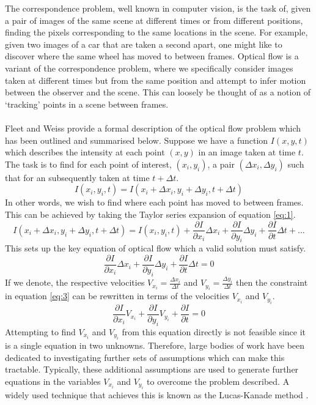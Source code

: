 The correspondence problem, well known in computer vision, is the task of, given a pair of images of the same scene at different times or from different positions, finding 
the pixels corresponding to the same locations in the scene.
For example, given two images of a car that are taken a second apart, one might like to discover where the same wheel has moved to between frames.
Optical flow is a variant of the correspondence problem, where we specifically consider images taken at different times but from the same position and attempt to infer motion between the observer 
and the scene. This can loosely be thought of as a notion of `tracking' points in a scene between frames.
\\\\
Fleet and Weiss \cite{Fleet2006} provide a formal description of the optical flow problem which has been outlined and summarised below.
Suppose we have a function $I(x,y,t)$ which describes the intensity at each point $(x,y)$ in an image taken at time $t$. 
The task is to find for each point of interest, $(x_i, y_i)$,
a pair $(\Delta x_i, \Delta y_i)$ such that for an subsequently taken at time $t + \Delta t$.
\begin{equation}
 I(x_i,y_i,t) = I(x_i + \Delta x_i, y_i + \Delta y_i, t+\Delta t)
 \label{eq:1}
\end{equation}
In other words, we wish to find where each point has moved to between frames.
This can be achieved by taking the Taylor series expansion of equation \ref{eq:1}.
\begin{equation}
I(x_i + \Delta x_i, y_i + \Delta y_i, t+\Delta t) = I(x_i,y_i,t) + \frac{\partial I}{\partial x_i}\Delta x_i + \frac{\partial I}{\partial y_i} \Delta y_i + \frac{\partial I}{\partial t} \Delta t + ... 
\label{eq:2}
\end{equation}
This sets up the key equation of optical flow which a valid solution must satisfy. 
\begin{equation}
    \frac{\partial I}{\partial x_i}\Delta x_i + \frac{\partial I}{\partial y_i} \Delta y_i + \frac{\partial I}{\partial t} \Delta t  = 0
    \label{eq:3}
\end{equation}
If we denote, the respective velocities $V_{x_i} = \frac{\Delta x_i}{\Delta t}$ and $V_{y_i} = \frac{\Delta y_i}{\Delta t}$ then the constraint in equation \ref{eq:3} 
can be rewritten in terms of the velocities $V_{x_i}$ and $V_{y_i}$.
\begin{equation*}
    \frac{\partial I}{\partial x_i}V_{x_i} + \frac{\partial I}{\partial y_i}  V_{y_i} + \frac{\partial I}{\partial t}  = 0
\end{equation*}
Attempting to find $V_{x_i}$ and $V_{y_i}$ from this equation directly is not feasible since it is a single equation in two unknowns.
Therefore, large bodies of work have been dedicated to investigating further sets of assumptions which can make this tractable.
Typically, these additional assumptions are used to generate further equations in the variables $V_{x_i}$ and $V_{y_i}$ to overcome the problem described. A widely used technique that achieves this is
known as the Lucas-Kanade method \cite{LucasKanade}.

